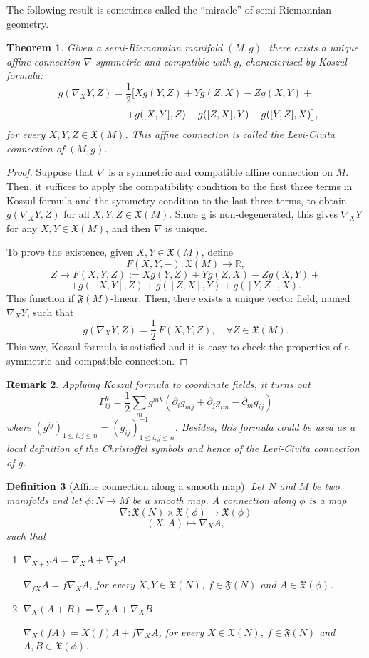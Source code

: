 \documentclass[11pt]{book}
\newtheorem{defi}{Definition}[chapter]
\newtheorem{theor}[defi]{Theorem}
\newtheorem{rem}[defi]{Remark}
\def\R{\mathbb R}
\def\F{\mathfrak F}
\def\x{\mathfrak X}
\begin{document}
The following result is sometimes called the ``miracle'' of semi-Riemannian geometry.
\begin{theor}
	Given a semi-Riemannian manifold $(M,g)$, there exists a unique affine connection $\nabla$ symmetric and compatible with $g$, characterised by Koszul formula:
	\[
	g(\nabla_X Y,Z)=\frac{1}{2} \big[Xg(Y,Z) + Yg(Z,X) -Zg(X,Y) +
	\]
	\[
	\hspace*{26mm}	+ g([X,Y],Z) + g([Z,X],Y) - g([Y,Z],X)\big],
	\]
	for every $X,Y,Z\in \x(M)$. This affine connection is called the Levi-Civita connection of $(M,g)$.
\end{theor}
\begin{proof}
	Suppose that $\nabla$ is a symmetric and compatible affine connection on $M$. Then, it suffices to apply the compatibility condition to the first three terms in Koszul formula and the symmetry condition to the last three terms, to obtain $g(\nabla_X Y,Z)$ for all $X,Y,Z\in \x(M)$. Since g is non-degenerated, this gives $\nabla_X Y$ for any $X,Y\in \x(M)$, and then $\nabla$ is unique.
	
	To prove the existence, given $X,Y\in \x(M)$, define
	\[
	F(X,Y,-):\x(M) \longrightarrow \R,
	\]
	\[
	Z \longmapsto F(X,Y,Z):=Xg(Y,Z) + Yg(Z,X) -Zg(X,Y) +
	\]
	\[
	+ g([X,Y],Z) + g([Z,X],Y) + g([Y,Z],X).
	\]
	This function if $\F(M)$-linear. Then, there exists a unique vector field, named $\nabla_X Y$, such that 
	\[
	g(\nabla_X Y,Z)=\frac{1}{2}\,F(X,Y,Z),\quad \forall Z\in \x(M).
	\] 
	This way, Koszul formula is satisfied and it is easy to check the properties of a symmetric and compatible connection.
\end{proof}

\begin{rem}
	{\rm 
		Applying Koszul formula to coordinate fields, it turns out
		\begin{equation}
			\Gamma_{ij}^k = \frac{1}{2} \sum_m g^{mk} (\partial_i g_{mj} + \partial_j g_{im} - \partial_m g_{ij})
		\end{equation}
		where $(g^{ij})_{1\le i,j \le n}=(g_{ij})_{1 \le i,j \le n}^{-1}$.
		Besides, this formula could be used as a local definition of the Christoffel symbols and hence of the Levi-Civita connection of $g$.
	} 
\end{rem}

\begin{defi}[Affine connection along a smooth map]\label{conexion along curva}
	Let $N$ and $M$ be two manifolds and let $\phi:N\to M$ be a smooth map. A connection along $\phi$ is a map
	\[
	\nabla:\x(N) \times \x(\phi)\longrightarrow \x(\phi)
	\]
	\[
	(X,A)\longmapsto \nabla_X A,
	\]
	such that
	\begin{enumerate}
		\item $\nabla_{X+Y} A=\nabla_X A + \nabla_Y A$
		
		$\nabla_{fX} A=f\nabla_X A$, for every $X,Y\in \x(N)$, $f\in \F(N)$ and $A\in \x(\phi)$.
		\item $\nabla_X (A+B)=\nabla_X A + \nabla_X B$
		
		$\nabla_X (fA)=X(f) A + f\nabla_X A$, for every $X\in \x(N)$, $f\in \F(N)$ and $A,B\in \x(\phi)$.
	\end{enumerate}
\end{defi}
\end{document}
